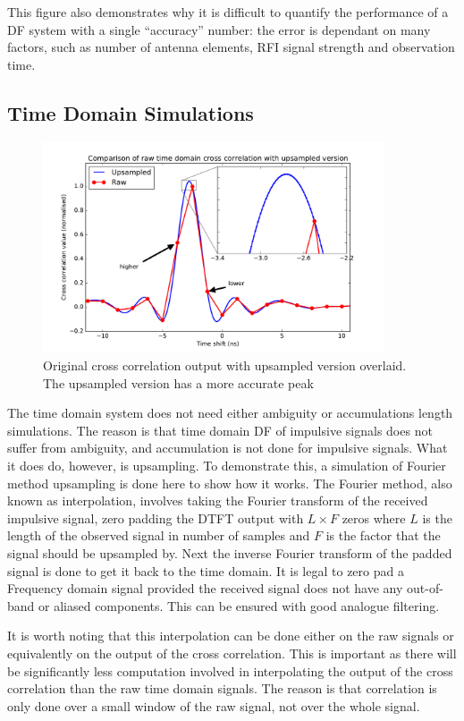 This figure also demonstrates why it is difficult to quantify the performance of a DF system with a single ``accuracy'' number: the error is dependant on many factors, such as number of antenna elements, RFI signal strength and observation time.

\subsection{Time Domain Simulations}
\begin{figure}
  \centering
  \includegraphics[width=0.9\textwidth]{time-domain-cross-raw-vs-upped}
  \caption{Original cross correlation output with upsampled version overlaid. The upsampled version has a more accurate peak}
  \label{fig:system-design-raw-vs-upsampled-timedomain}
\end{figure}
The time domain system does not need either ambiguity or accumulations length simulations. The reason is that time domain DF of impulsive signals does not suffer from ambiguity, and accumulation is not done for impulsive signals. What it does do, however, is upsampling. To demonstrate this, a simulation of Fourier method upsampling is done here to show how it works. The Fourier method, also known as interpolation, involves taking the Fourier transform of the received impulsive signal, zero padding the DTFT output with \(L \times F\) zeros where \(L\) is the length of the observed signal in number of samples and \(F\) is the factor that the signal should be upsampled by. Next the inverse Fourier transform of the padded signal is done to get it  back to the time domain. It is legal to zero pad a Frequency domain signal provided the received signal does not have any out-of-band or aliased components. This can be ensured with good analogue filtering.

It is worth noting that this interpolation can be done either on the raw signals or equivalently on the output of the cross correlation. This is important as there will be significantly less computation involved in interpolating the output of the cross correlation than the raw time domain signals. The reason is that correlation is only done over a small window of the raw signal, not over the whole signal.\\

